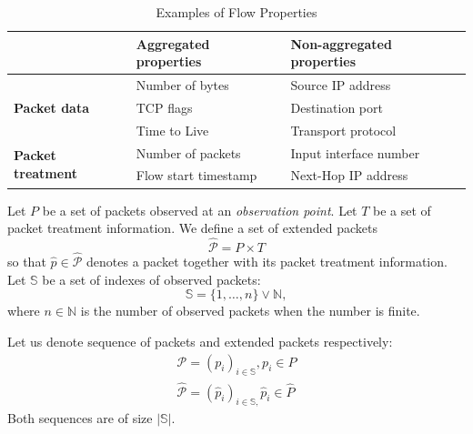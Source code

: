 \begin{table}[ht!]
	\centering
	\begin{tabular}{lll}
	\toprule
	                                           & \textbf{Aggregated properties}  & \textbf{Non-aggregated properties}  \\ \midrule
	\multirow{3}{*}{\textbf{Packet data}}      & Number of bytes                 & Source IP address                   \\ 
	                                           & TCP flags                       & Destination port                    \\ 
	                                           & Time to Live                    & Transport protocol                  \\ \midrule
	\multirow{2}{*}{\textbf{Packet treatment}} & Number of packets               & Input interface number              \\ 
	                                           & Flow start timestamp            & Next-Hop IP address                 \\ \bottomrule
	\end{tabular}
	\caption{Examples of Flow Properties}
	\label{tab:flow.properties}
\end{table}



Let $P$ be a set of packets observed at an \emph{observation point}. Let $T$ be a set of packet treatment information. We define a set of extended packets
\begin{equation*}
	\widehat{\mathcal{P}} = P\times T
\end{equation*}
so that $\widehat{p} \in \widehat{\mathcal{P}}$ denotes a packet together with its packet treatment information. Let $\mathbb{S}$ be a set of indexes of observed packets:
\begin{equation*}
	\mathbb{S} = \{1, \ldots, n\} \lor \mathbb{N},
\end{equation*}
where $n \in \mathbb{N}$ is the number of observed packets when the number is finite.

Let us denote sequence of packets and extended packets respectively:
\begin{align*}
	\mathcal{P} = (p_i)_{i \in \mathbb{S}}, p_i \in P\\
	\widehat{\mathcal{P}} = (\widehat{p}_i)_{i \in \mathbb{S},} \widehat{p}_i \in \widehat{P}
\end{align*}
Both sequences are of size $|\mathbb{S}|$. 

